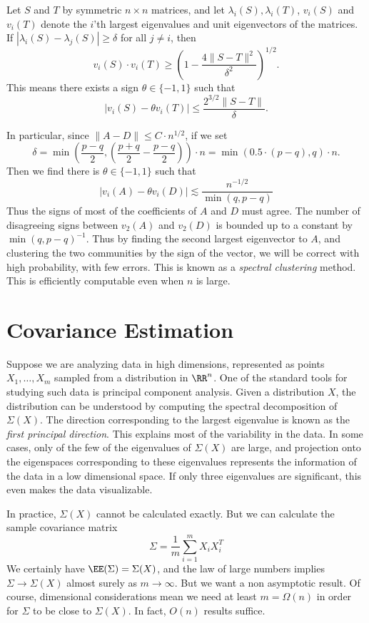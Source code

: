\begin{theorem}
	Let $S$ and $T$ by symmetric $n \times n$ matrices, and let $\lambda_i(S), \lambda_i(T)$, $v_i(S)$ and $v_i(T)$ denote the $i$'th largest eigenvalues and unit eigenvectors of the matrices. If $|\lambda_i(S) - \lambda_j(S)| \geq \delta$ for all $j \neq i$, then
	\[ v_i(S) \cdot v_i(T) \geq \left( 1 - \frac{4 \| S - T \|^2}{\delta^2} \right)^{1/2}. \]
	This means there exists a sign $\theta \in \{ -1, 1 \}$ such that
	\[ |v_i(S) - \theta v_i(T)| \leq \frac{2^{3/2} \| S - T \|}{\delta}. \]
\end{theorem}

In particular, since $\| A - D \| \leq C \cdot n^{1/2}$, if we set
%
\[ \delta = \min \left( \frac{p - q}{2}, \left( \frac{p + q}{2} - \frac{p - q}{2} \right) \right) \cdot n = \min(0.5 \cdot (p-q), q) \cdot n. \]
%
Then we find there is $\theta \in \{ -1 , 1 \}$ such that
%
\[ |v_i(A) - \theta v_i(D)| \lesssim \frac{n^{-1/2}}{\min(q,p-q)} \]
%
Thus the signs of most of the coefficients of $A$ and $D$ must agree. The number of disagreeing signs between $v_2(A)$ and $v_2(D)$ is bounded up to a constant by $\min(q,p-q)^{-1}$. Thus by finding the second largest eigenvector to $A$, and clustering the two communities by the sign of the vector, we will be correct with high probability, with few errors. This is known as a {\it spectral clustering} method. This is efficiently computable even when $n$ is large.

\section{Covariance Estimation}

Suppose we are analyzing data in high dimensions, represented as points $X_1, \dots, X_m$ sampled from a distribution in $\RR^n$. One of the standard tools for studying such data is principal component analysis. Given a distribution $X$, the distribution can be understood by computing the spectral decomposition of $\Sigma(X)$. The direction corresponding to the largest eigenvalue is known as the {\it first principal direction}. This explains most of the variability in the data. In some cases, only of the few of the eigenvalues of $\Sigma(X)$ are large, and projection onto the eigenspaces corresponding to these eigenvalues represents the information of the data in a low dimensional space. If only three eigenvalues are significant, this even makes the data visualizable.

In practice, $\Sigma(X)$ cannot be calculated exactly. But we can calculate the sample covariance matrix
%
\[ \Sigma = \frac{1}{m} \sum_{i = 1}^m X_i X_i^T \]
%
We certainly have $\EE(\Sigma) = \Sigma(X)$, and the law of large numbers implies $\Sigma \to \Sigma(X)$ almost surely as $m \to \infty$. But we want a non asymptotic result. Of course, dimensional considerations mean we need at least $m = \Omega(n)$ in order for $\Sigma$ to be close to $\Sigma(X)$. In fact, $O(n)$ results suffice.


